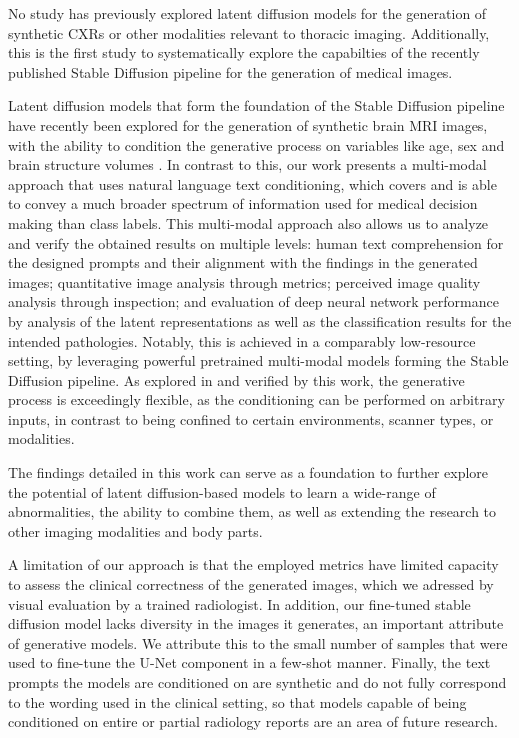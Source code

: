 \documentclass{article}
\begin{document}
No study has previously explored latent diffusion models for the generation of synthetic CXRs or other modalities relevant to thoracic imaging. Additionally, this is the first study to systematically explore the capabilties of the recently published Stable Diffusion pipeline for the generation of medical images.

Latent diffusion models that form the foundation of the Stable Diffusion pipeline have recently been explored for the generation of synthetic brain MRI images, with the ability to condition the generative process on variables like age, sex and brain structure volumes \citep{pinaya2022ldmbrain}. In contrast to this, our work presents a multi-modal approach that uses natural language text conditioning, which covers and is able to convey a much broader spectrum of information used for medical decision making than class labels. This multi-modal approach also allows us to analyze and verify the obtained results on multiple levels: human text comprehension for the designed prompts and their alignment with the findings in the generated images; quantitative image analysis through metrics; perceived image quality analysis through inspection; and evaluation of deep neural network  performance by analysis of the latent representations as well as the classification results for the intended pathologies. Notably, this is achieved in a comparably low-resource setting, by leveraging powerful pretrained multi-modal models forming the Stable Diffusion pipeline. As explored in and verified by this work, the generative process is exceedingly flexible, as the conditioning can be performed on arbitrary inputs, in contrast to being confined to certain environments, scanner types, or modalities.

The findings detailed in this work can serve as a foundation to further explore the potential of latent diffusion-based models to learn a wide-range of abnormalities, the ability to combine them, as well as extending the research to other imaging modalities and body parts. 

A limitation of our approach is that the employed metrics have limited capacity to assess the clinical correctness of the generated images, which we adressed by visual evaluation by a trained radiologist. In addition, our fine-tuned stable diffusion model lacks diversity in the images it generates, an important attribute of generative models. We attribute this to the small number of samples that were used to fine-tune the U-Net component in a few-shot manner. Finally, the text prompts the models are conditioned on are synthetic and do not fully correspond to the wording used in the clinical setting, so that models capable of being conditioned on entire or partial radiology reports are an area of future research.
\end{document}
